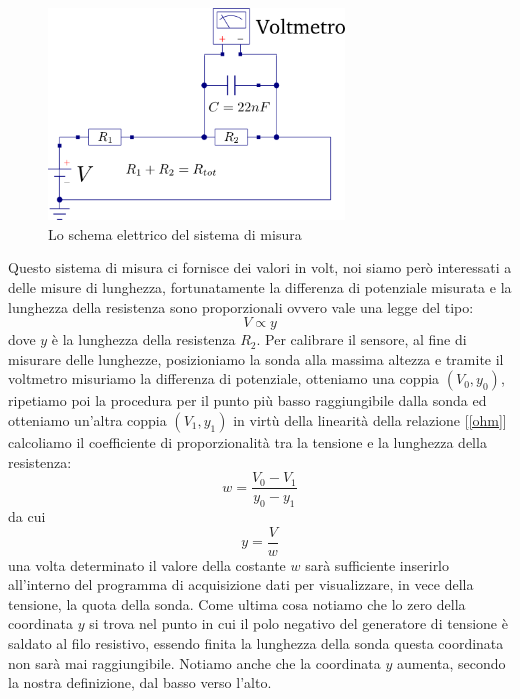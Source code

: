 \documentclass[a4paper,10pt,oneside]{article}
\begin{document}
\begin{figure}[H]
 \centering
 \includegraphics[width=0.7\textwidth]{./Immagini/schema_misura_verticale.png}
 \caption{Lo schema elettrico del sistema di misura}
 \label{fig:schema_elettrico}
\end{figure}
Questo sistema di misura ci fornisce dei valori in volt, noi siamo però interessati a delle misure di lunghezza, fortunatamente la differenza di potenziale misurata e la lunghezza della resistenza sono proporzionali ovvero vale una legge del tipo:
\begin{equation}\label{ohm}
 V\propto y
\end{equation}
dove $y$ è la lunghezza della resistenza $R_2$. Per calibrare il sensore, al fine di misurare delle lunghezze, posizioniamo la sonda alla massima altezza e tramite il voltmetro misuriamo la differenza di potenziale, otteniamo una coppia $(V_0,y_0)$, ripetiamo poi la procedura per il punto più basso raggiungibile dalla sonda ed otteniamo un'altra coppia $(V_1,y_1)$ in virtù della linearità della relazione [\ref{ohm}] calcoliamo il coefficiente di proporzionalità tra la tensione e la lunghezza della resistenza:
\begin{equation}
 w=\frac{V_0-V_1}{y_0-y_1}
\end{equation}
da cui
\begin{equation}
y=\frac V w 
\end{equation}
una volta determinato il valore della costante $w$ sarà sufficiente inserirlo all'interno del programma di acquisizione dati per visualizzare, in vece della tensione, la quota della sonda.
Come ultima cosa notiamo che lo zero della coordinata $y$ si trova nel punto in cui il polo negativo del generatore di tensione è saldato al filo resistivo, essendo finita la lunghezza della sonda questa coordinata non sarà mai raggiungibile. Notiamo anche che la coordinata $y$ aumenta, secondo la nostra definizione, dal basso verso l'alto.
\end{document}

